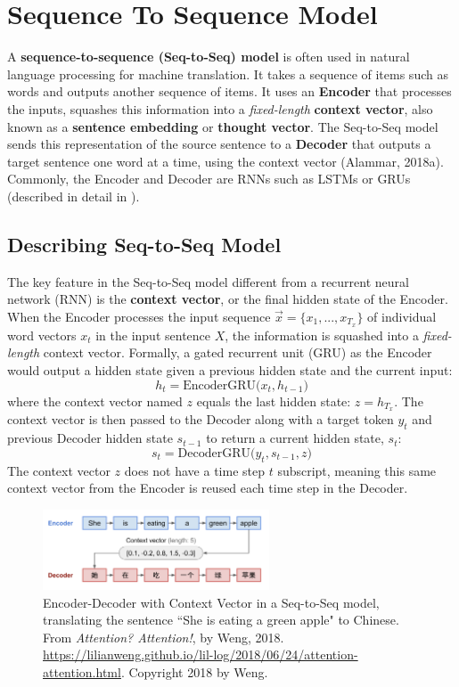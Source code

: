 \section{Sequence To Sequence Model}

A \textbf{sequence-to-sequence (Seq-to-Seq) model} is often used in natural language processing for machine translation. It takes a sequence of items such as words and outputs another sequence of items. It uses an \textbf{Encoder} that processes the inputs, squashes this information into a \emph{fixed-length} \textbf{context vector}, also known as a \textbf{sentence embedding} or \textbf{thought vector}. The Seq-to-Seq model sends this representation of the source sentence to a \textbf{Decoder} that outputs a target sentence one word at a time, using the context vector (Alammar, 2018a). Commonly, the Encoder and Decoder are RNNs such as LSTMs or GRUs (described in detail in ).


\subsection{Describing Seq-to-Seq Model}

The key feature in the Seq-to-Seq model different from a recurrent neural network (RNN) is the \textbf{context vector}, or the final hidden state of the Encoder. When the Encoder processes the input sequence $\overrightarrow{x} = \{ x_1, ..., x_{T_x} \}$ of individual word vectors $x_t$ in the input sentence $X$, the information is squashed into a \emph{fixed-length} context vector. Formally, a gated recurrent unit (GRU) as the Encoder would output a hidden state given a previous hidden state and the current input: 
$$
h_t = \text{EncoderGRU} \Big( x_t, h_{t-1} \Big)
$$ 
where the context vector named $z$ equals the last hidden state: $z = h_{T_x}$. 
\newline 
The context vector is then passed to the Decoder along with a target token $y_t$ and previous Decoder hidden state $s_{t-1}$ to return a current hidden state, $s_t$:
$$
s_t = \text{DecoderGRU} \Big( y_t, s_{t-1}, z \Big)
$$
The context vector $z$ does not have a time step $t$ subscript, meaning this same context vector from the Encoder is reused each time step in the Decoder. 


\begin{figure}[h]
\vspace{-5pt}
\centering
\includegraphics[width=0.6\textwidth]{imgs/seqtoseq_greenapple.png}
\vspace{-5pt}
\caption{\footnotesize Encoder-Decoder with Context Vector in a Seq-to-Seq model, translating the sentence ``She is eating a green apple" to Chinese. From \emph{Attention? Attention!}, by Weng, 2018. \url{https://lilianweng.github.io/lil-log/2018/06/24/attention-attention.html}. Copyright 2018 by Weng.}
\vspace{-5pt}
\end{figure}


